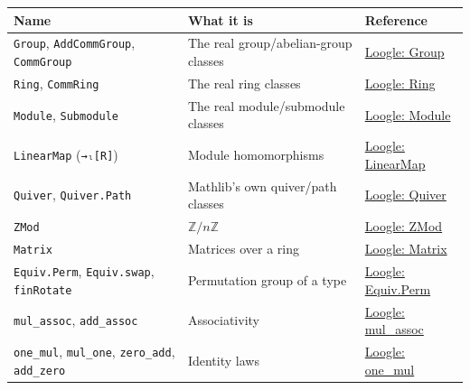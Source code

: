\begin{longtable}[]{@{}
  >{\raggedright\arraybackslash}p{}
  >{\raggedright\arraybackslash}p{}
  >{\raggedright\arraybackslash}p{}@{}}
\toprule\noalign{}
\begin{minipage}[b]{\linewidth}\raggedright
Name
\end{minipage} & \begin{minipage}[b]{\linewidth}\raggedright
What it is
\end{minipage} & \begin{minipage}[b]{\linewidth}\raggedright
Reference
\end{minipage} \\
\midrule\noalign{}
\endhead
\bottomrule\noalign{}
\endlastfoot
\texttt{Group}, \texttt{AddCommGroup}, \texttt{CommGroup} & The real group/abelian-group classes & \href{https://loogle.lean-lang.org/?q=Group}{Loogle: Group} \\
\texttt{Ring}, \texttt{CommRing} & The real ring classes & \href{https://loogle.lean-lang.org/?q=Ring}{Loogle: Ring} \\
\texttt{Module}, \texttt{Submodule} & The real module/submodule classes & \href{https://loogle.lean-lang.org/?q=Module}{Loogle: Module} \\
\texttt{LinearMap} (\texttt{→ₗ[R]}) & Module homomorphisms & \href{https://loogle.lean-lang.org/?q=LinearMap}{Loogle: LinearMap} \\
\texttt{Quiver}, \texttt{Quiver.Path} & Mathlib's own quiver/path classes & \href{https://loogle.lean-lang.org/?q=Quiver}{Loogle: Quiver} \\
\texttt{ZMod} & \(\mathbb{Z}/n\mathbb{Z}\) & \href{https://loogle.lean-lang.org/?q=ZMod}{Loogle: ZMod} \\
\texttt{Matrix} & Matrices over a ring & \href{https://loogle.lean-lang.org/?q=Matrix}{Loogle: Matrix} \\
\texttt{Equiv.Perm}, \texttt{Equiv.swap}, \texttt{finRotate} & Permutation group of a type & \href{https://loogle.lean-lang.org/?q=Equiv.Perm}{Loogle: Equiv.Perm} \\
\texttt{mul\_\allowbreak{}assoc}, \texttt{add\_\allowbreak{}assoc} & Associativity & \href{https://loogle.lean-lang.org/?q=mul_assoc}{Loogle: mul\_assoc} \\
\texttt{one\_\allowbreak{}mul}, \texttt{mul\_\allowbreak{}one}, \texttt{zero\_\allowbreak{}add}, \texttt{add\_\allowbreak{}zero} & Identity laws & \href{https://loogle.lean-lang.org/?q=one_mul}{Loogle: one\_mul} \\

\end{longtable}
